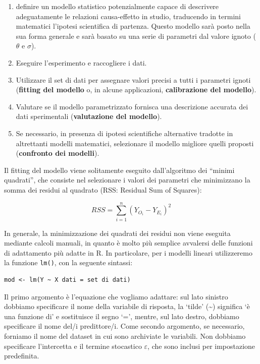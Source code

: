 \documentclass[
  12pt,
]{book}
\providecommand{\tightlist}{%
  \setlength{\itemsep}{0pt}\setlength{\parskip}{0pt}}
\begin{document}
\begin{enumerate}
\def\labelenumi{\arabic{enumi}.}
\tightlist
\item
  definire un modello statistico potenzialmente capace di descrivere adeguatamente le relazioni causa-effetto in studio, traducendo in termini matematici l'ipotesi scientifica di partenza. Questo modello sarà posto nella sua forma generale e sarà basato su una serie di parametri dal valore ignoto (\(\theta\) e \(\sigma\)).
\item
  Eseguire l'esperimento e raccogliere i dati.
\item
  Utilizzare il set di dati per assegnare valori precisi a tutti i parametri ignoti (\textbf{fitting del modello} o, in alcune applicazioni, \textbf{calibrazione del modello}).
\item
  Valutare se il modello parametrizzato fornisca una descrizione accurata dei dati sperimentali (\textbf{valutazione del modello}).
\item
  Se necessario, in presenza di ipotesi scientifiche alternative tradotte in altrettanti modelli matematici, selezionare il modello migliore quelli proposti (\textbf{confronto dei modelli}).
\end{enumerate}

Il fitting del modello viene solitamente eseguito dall'algoritmo dei ``minimi quadrati'', che consiste nel selezionare i valori dei parametri che minimizzano la somma dei residui al quadrato (RSS: Residual Sum of Squares):

\[RSS = \sum_{i = 1}^n{\left( Y_{O_i} - Y_{E_i} \right)^2}\]

In generale, la minimizzazione dei quadrati dei residui non viene eseguita mediante calcoli manuali, in quanto è molto più semplice avvalersi delle funzioni di adattamento più adatte in R. In particolare, per i modelli lineari utilizzeremo la funzione \texttt{lm()}, con la seguente sintassi:

\begin{verbatim}
mod <- lm(Y ~ X dati = set di dati)
\end{verbatim}

Il primo argomento è l'equazione che vogliamo adattare: sul lato sinistro dobbiamo specificare il nome della variabile di risposta, la `tilde' (\textasciitilde) significa `è una funzione di' e sostituisce il segno `=', mentre, sul lato destro, dobbiamo specificare il nome del/i predittore/i. Come secondo argomento, se necessario, forniamo il nome del dataset in cui sono archiviate le variabili. Non dobbiamo specificare l'intercetta e il termine stocastico \(\varepsilon\), che sono inclusi per impostazione predefinita.
\end{document}

